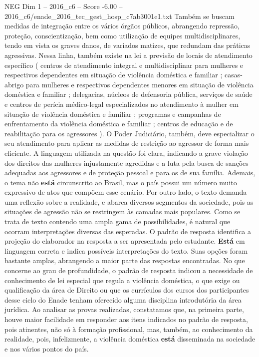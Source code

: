 \begin{textsample}{NEG Dim 1 – 2016\_c6 – Score -6.00 – 2016\_c6/enade\_2016\_tec\_gest\_hosp\_c7ab3001e1.txt}
Também se buscam medidas de integração entre os vários órgãos públicos, abrangendo repressão, proteção, conscientização, bem como utilização de equipes multidisciplinares, tendo em vista os graves danos, de variados matizes, que redundam das práticas agressivas.
Nessa linha, também existe na lei a previsão de locais de atendimento específico ( centros de atendimento integral e multidisciplinar para mulheres e respectivos dependentes em situação de violência doméstica e familiar ; casas-abrigo para mulheres e respectivos dependentes menores em situação de violência doméstica e familiar ; delegacias, núcleos de defensoria pública, serviços de saúde e centros de perícia médico-legal especializados no atendimento à mulher em situação de violência doméstica e familiar ; programas e campanhas de enfrentamento da violência doméstica e familiar ; centros de educação e de reabilitação para os agressores ).
O Poder Judiciário, também, deve especializar o seu atendimento para aplicar as medidas de restrição ao agressor de forma mais eficiente.
A linguagem utilizada na questão foi clara, indicando a grave violação dos direitos das mulheres injustamente agredidas e a luta pela busca de sanções adequadas aos agressores e de proteção pessoal e para os de sua família.
Ademais, o tema não \textbf{está} circunscrito ao Brasil, mas o país possui um número muito expressivo de atos que compõem esse cenário.
Por outro lado, o texto demanda uma reflexão sobre a realidade, e abarca diversos segmentos da sociedade, pois as situações de agressão não se restringem às camadas mais populares.
Como se trata de texto contendo uma ampla gama de possibilidades, é natural que ocorram interpretações diversas das esperadas.
O padrão de resposta identifica a projeção do elaborador na resposta a ser apresentada pelo estudante. \textbf{Está} em linguagem correta e indica possíveis interpretações do texto.
Suas opções foram bastante amplas, abrangendo a maior parte das respostas encontradas.
No que concerne ao grau de profundidade, o padrão de resposta indicou a necessidade de conhecimento de lei especial que regula a violência doméstica, o que exige ou qualificação da área de Direito ou que os currículos dos cursos dos participantes desse ciclo do Enade tenham oferecido alguma disciplina introdutória da área jurídica.
Ao analisar as provas realizadas, constatamos que, na primeira parte, houve maior facilidade em responder aos itens indicados no padrão de resposta, pois atinentes, não só à formação profissional, mas, também, ao conhecimento da realidade, pois, infelizmente, a violência doméstica \textbf{está} disseminada na sociedade e nos vários pontos do país.

\end{textsample}
